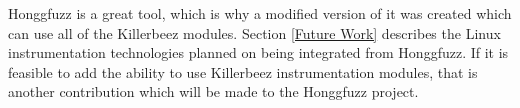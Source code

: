 Honggfuzz is a great tool, which is why a modified version of it was created
which can use all of the Killerbeez modules.\cite{honggfuzzgrimm} Section
\ref{Future Work} describes the Linux instrumentation technologies planned on
being integrated from Honggfuzz. If it is feasible to add the ability to use
Killerbeez instrumentation modules, that is another contribution which will be
made to the Honggfuzz project.
